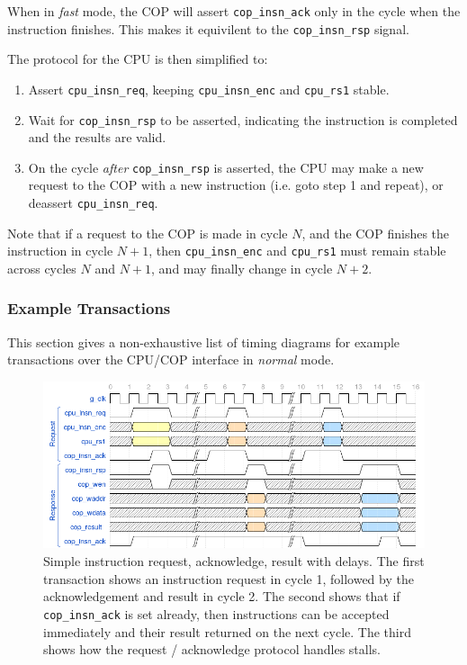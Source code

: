 \documentclass{scarv-report}
\begin{document}
When in {\em fast} mode, the COP will assert {\tt cop\_insn\_ack} only
in the cycle when the instruction finishes. This makes it equivilent
to the {\tt cop\_insn\_rsp} signal.

The protocol for the CPU is then simplified to:
\begin{enumerate}
\item
Assert {\tt cpu\_insn\_req}, keeping {\tt cpu\_insn\_enc} and
{\tt cpu\_rs1} stable.
\item
Wait for {\tt cop\_insn\_rsp} to be asserted, indicating the instruction
is completed and the results are valid.
\item
On the cycle {\em after} {\tt cop\_insn\_rsp} is asserted, the CPU may
make a new request to the COP with a new instruction (i.e. goto
step 1 and repeat), or deassert {\tt cpu\_insn\_req}.
\end{enumerate}

Note that if a request to the COP is made in cycle $N$, and the COP finishes
the instruction in cycle $N+1$, then 
{\tt cpu\_insn\_enc} and {\tt cpu\_rs1}
must remain stable across cycles $N$ and $N+1$, and may finally change
in cycle $N+2$.

\subsubsection{Example Transactions}

This section gives a non-exhaustive list of timing diagrams for example
transactions over the CPU/COP interface in {\em normal} mode.

\begin{figure}[H]
\centering
\includegraphics[width=\textwidth]{image/cpu-cop-if-1.png}
\caption{Simple instruction request, acknowledge, result with delays.
The first transaction shows an instruction request in cycle 1, followed
by the acknowledgement and result in cycle 2.
The second shows that if {\tt cop\_insn\_ack} is set already, then
instructions can be accepted immediately and their result returned on the next
cycle.  The third shows how the request / acknowledge protocol handles
stalls.}
\label{fig:cpu-cop-if-waves-1}
\end{figure}
\end{document}
